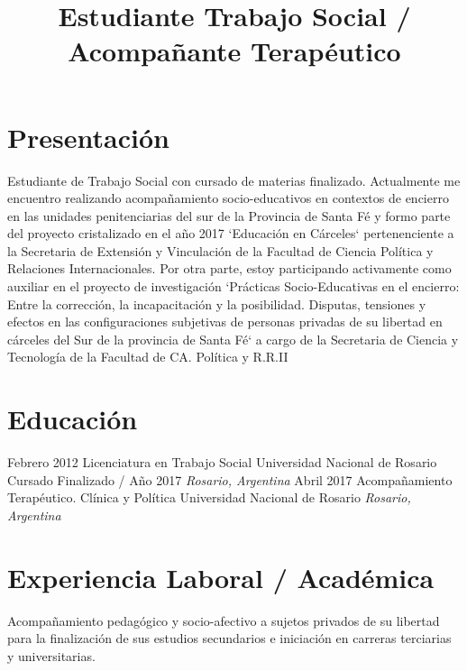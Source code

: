 \documentclass[11pt,a4paper,sans]{moderncv}        %
\title{Estudiante Trabajo Social / Acompañante Terap\'eutico}                               %
\begin{document}
\makecvtitle

\section{Presentación}
Estudiante de Trabajo Social con cursado de materias finalizado. Actualmente me encuentro realizando acompañamiento socio-educativos en contextos de encierro en las unidades penitenciarias del sur de la Provincia de Santa F\'e y formo parte del proyecto cristalizado en el año 2017 `Educación en Cárceles` pertenenciente a la Secretaria de Extensi\'on y Vinculación de la Facultad de Ciencia Pol\'itica y Relaciones Internacionales. Por otra parte, estoy participando activamente como auxiliar en el proyecto de investigaci\'on `Pr\'acticas Socio-Educativas en el encierro: Entre la correcci\'on, la incapacitación y la posibilidad. Disputas, tensiones y efectos en las configuraciones subjetivas de personas privadas de su libertad en cárceles del Sur de la provincia de Santa F\'e` a cargo de la Secretaria de Ciencia y Tecnología de la Facultad de CA. Política y R.R.II
\vspace{2mm}

\section{Educación}
\cventry
{Febrero 2012}
{Licenciatura en Trabajo Social}
{Universidad Nacional de Rosario} 
{Cursado Finalizado / Año 2017} 
{}
{\textit{Rosario, Argentina}}
{}
\cventry
{Abril 2017}
{Acompañamiento Terap\'eutico. Clínica y Política}
{Universidad Nacional de Rosario}
{}
{\textit{Rosario, Argentina}}
{}
\vspace{2mm}

\section{Experiencia Laboral / Acad\'emica}
  {
    Acompañamiento pedagógico y socio-afectivo a sujetos privados de su libertad para la finalización de sus estudios secundarios e iniciación en carreras terciarias y universitarias.
  }
\vspace{3mm}
\end{document}
